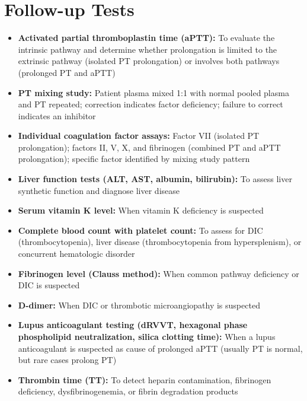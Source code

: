 \section*{Follow-up Tests}
\begin{itemize}
  \item \textbf{Activated partial thromboplastin time (aPTT):} To evaluate the intrinsic pathway and determine whether prolongation is limited to the extrinsic pathway (isolated PT prolongation) or involves both pathways (prolonged PT and aPTT)
  \item \textbf{PT mixing study:} Patient plasma mixed 1:1 with normal pooled plasma and PT repeated; correction indicates factor deficiency; failure to correct indicates an inhibitor
  \item \textbf{Individual coagulation factor assays:} Factor VII (isolated PT prolongation); factors II, V, X, and fibrinogen (combined PT and aPTT prolongation); specific factor identified by mixing study pattern
  \item \textbf{Liver function tests (ALT, AST, albumin, bilirubin):} To assess liver synthetic function and diagnose liver disease
  \item \textbf{Serum vitamin K level:} When vitamin K deficiency is suspected
  \item \textbf{Complete blood count with platelet count:} To assess for DIC (thrombocytopenia), liver disease (thrombocytopenia from hypersplenism), or concurrent hematologic disorder
  \item \textbf{Fibrinogen level (Clauss method):} When common pathway deficiency or DIC is suspected
  \item \textbf{D-dimer:} When DIC or thrombotic microangiopathy is suspected
  \item \textbf{Lupus anticoagulant testing (dRVVT, hexagonal phase phospholipid neutralization, silica clotting time):} When a lupus anticoagulant is suspected as cause of prolonged aPTT (usually PT is normal, but rare cases prolong PT)
  \item \textbf{Thrombin time (TT):} To detect heparin contamination, fibrinogen deficiency, dysfibrinogenemia, or fibrin degradation products
\end{itemize}

